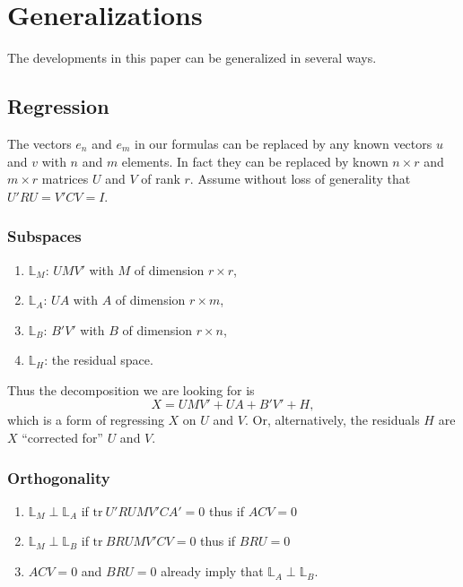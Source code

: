 \documentclass[
  12pt,
  letterpaper,
  DIV=11,
  numbers=noendperiod]{scrartcl}
\providecommand{\tightlist}{%
  \setlength{\itemsep}{0pt}\setlength{\parskip}{0pt}}
\begin{document}
\section{Generalizations}\label{generalizations}

The developments in this paper can be generalized in several ways.

\subsection{Regression}\label{regression}

The vectors \(e_n\) and \(e_m\) in our formulas can be replaced by any
known vectors \(u\) and \(v\) with \(n\) and \(m\) elements. In fact
they can be replaced by known \(n\times r\) and \(m\times r\) matrices
\(U\) and \(V\) of rank \(r\). Assume without loss of generality that
\(U'RU=V'CV=I\).

\subsubsection{Subspaces}\label{subspaces-1}

\begin{enumerate}
\def\labelenumi{\arabic{enumi}.}
\tightlist
\item
  \(\mathbb{L}_M\): \(UMV'\) with \(M\) of dimension \(r\times r\),
\item
  \(\mathbb{L}_A\): \(UA\) with \(A\) of dimension \(r\times m\),
\item
  \(\mathbb{L}_B\): \(B'V'\) with \(B\) of dimension \(r\times n\),
\item
  \(\mathbb{L}_H\): the residual space.
\end{enumerate}

Thus the decomposition we are looking for is \begin{equation}
X=UMV'+UA+B'V'+H,
\end{equation} which is a form of regressing \(X\) on \(U\) and \(V\).
Or, alternatively, the residuals \(H\) are \(X\) ``corrected for'' \(U\)
and \(V\).

\subsubsection{Orthogonality}\label{orthogonality}

\begin{enumerate}
\def\labelenumi{\arabic{enumi}.}
\tightlist
\item
  \(\mathbb{L}_M\perp\mathbb{L}_A\) if \(\text{tr}\ U'RUMV'CA'=0\) thus
  if \(ACV=0\)
\item
  \(\mathbb{L}_M\perp\mathbb{L}_B\) if \(\text{tr}\ BRUMV'CV=0\) thus if
  \(BRU=0\)
\item
  \(ACV=0\) and \(BRU=0\) already imply that
  \(\mathbb{L}_A\perp\mathbb{L}_B\).
\end{enumerate}
\end{document}
